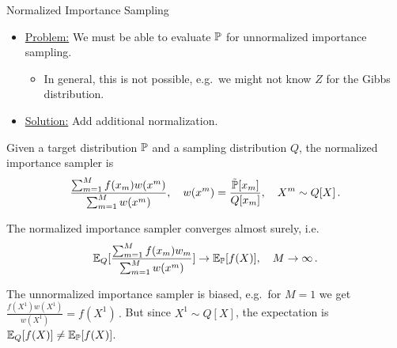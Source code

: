 \begin{frame}{Normalized Importance Sampling}
\begin{itemize}
    \item \underline{Problem:} We must be able to evaluate $\Pb$ for unnormalized importance sampling.
    \begin{itemize}
        \item In general, this is not possible, e.g.\ we might not know $Z$ for the Gibbs distribution.
    \end{itemize}
\item \underline{Solution:} Add additional normalization.
\end{itemize}
\pause
\begin{definition}
   Given a target distribution $\Pb$ and a sampling distribution $Q$, the normalized importance sampler is 
   \begin{equation}
\frac{\sum_{m=1}^M f(x_m) w(x^m)}{\sum_{m=1}^M w(x^m)}, \quad w(x^m) = \frac{\tilde{\Pb}[x_m]}{Q[x_m]}, \quad X^m \sim Q[X]\,.
   \end{equation}
\end{definition}
\pause
\begin{proposition}
    The normalized importance sampler converges almost surely, i.e.
    \begin{equation}
\E_{Q}[\frac{\sum_{m=1}^M f(x_m) w_m}{\sum_{m=1}^M w(x^m)}] \rightarrow \E_{\Pb}[f(X)],\quad M \rightarrow \infty\,.
    \end{equation}
\end{proposition}
\pause
\begin{remark}
The unnormalized importance sampler is biased, e.g.\ for $M = 1$ we get
    $\frac{f(X^1) w(X^1)}{w(X^1)} = f(X^1)\,.$
But since $X^1 \sim Q[X]$, the expectation is $\E_{Q}[f(X)] \neq \E_{\Pb}[f(X)]$.
\end{remark}
\end{frame}

